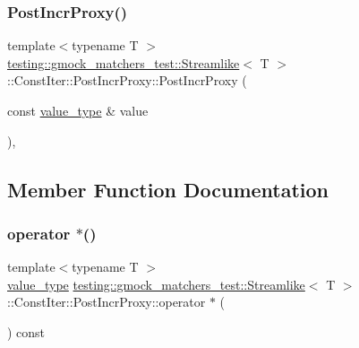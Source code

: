 \subsubsection{\texorpdfstring{PostIncrProxy()}{PostIncrProxy()}}
{\footnotesize\ttfamily template$<$typename T $>$ \\
\mbox{\hyperlink{classtesting_1_1gmock__matchers__test_1_1_streamlike}{testing\+::gmock\+\_\+matchers\+\_\+test\+::\+Streamlike}}$<$ T $>$\+::Const\+Iter\+::\+Post\+Incr\+Proxy\+::\+Post\+Incr\+Proxy (\begin{DoxyParamCaption}\item[{const \mbox{\hyperlink{classtesting_1_1gmock__matchers__test_1_1_streamlike_a7e2c2e021676c1ed5dea63cdd019661c}{value\+\_\+type}} \&}]{value }\end{DoxyParamCaption})\hspace{0.3cm}{\ttfamily [inline]}, {\ttfamily [explicit]}}



\subsection{Member Function Documentation}
\mbox{\label{classtesting_1_1gmock__matchers__test_1_1_streamlike_1_1_const_iter_1_1_post_incr_proxy_a8b1cf42698f3315e9d8c65891bfeb8d7}} 
\subsubsection{\texorpdfstring{operator $\ast$()}{operator *()}}
{\footnotesize\ttfamily template$<$typename T $>$ \\
\mbox{\hyperlink{classtesting_1_1gmock__matchers__test_1_1_streamlike_a7e2c2e021676c1ed5dea63cdd019661c}{value\+\_\+type}} \mbox{\hyperlink{classtesting_1_1gmock__matchers__test_1_1_streamlike}{testing\+::gmock\+\_\+matchers\+\_\+test\+::\+Streamlike}}$<$ T $>$\+::Const\+Iter\+::\+Post\+Incr\+Proxy\+::operator $\ast$ (\begin{DoxyParamCaption}{ }\end{DoxyParamCaption}) const\hspace{0.3cm}{\ttfamily [inline]}}




